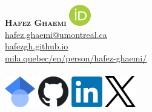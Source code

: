 \documentclass[A4,11pt]{article}
\begin{document}
%
\begin{minipage}[c]{0.4\textwidth}
    \textbf{\Huge \scshape{Hafez Ghaemi}} \href{https://orcid.org/0000-0001-6326-5258}{\includegraphics[width=0.07\textwidth]{orcid}} \\ \vspace{1pt} 
    \href{mailto:hafez.ghaemi@umontreal.ca}{\underline{hafez.ghaemi@umontreal.ca}}\\ \vspace{1pt} 
      \href{https://hafezgh.github.io/}{\underline{hafezgh.github.io}}\\ \vspace{1pt} 
      \href{https://mila.quebec/en/person/hafez-ghaemi/}{\underline{mila.quebec/en/person/hafez-ghaemi/}} \\ \\  \vspace{1pt}
    \href{https://scholar.google.com/citations?user=JCLX6oYAAAAJ&hl=en}{\includegraphics[width=0.1\textwidth]{scholar}}
    \href{https://github.com/hafezgh}{\includegraphics[width=0.1\textwidth]{github}}
    \href{https://www.linkedin.com/in/hafez-ghaemi-618b8287/}{\includegraphics[width=0.1\textwidth]{linkedin}}
    \href{https://x.com/hafezghm}{\includegraphics[width=0.1\textwidth]{x}}
\end{minipage}
\end{document}
